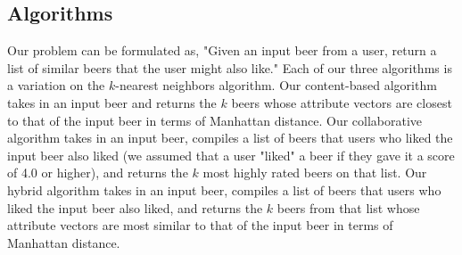 \documentclass[11pt]{article}
\begin{document}
\subsection*{Algorithms}
Our problem can be formulated as, "Given an input beer from a user, return a list of similar beers that the user might also like." Each of our three algorithms is a variation on the $k$-nearest neighbors algorithm. Our content-based algorithm takes in an input beer and returns the $k$ beers whose attribute vectors are closest to that of the input beer in terms of Manhattan distance. Our collaborative algorithm takes in an input beer, compiles a list of beers that users who liked the input beer also liked (we assumed that a user "liked"  a beer if they gave it a score of 4.0 or higher), and returns the $k$ most highly rated beers on that list. Our hybrid algorithm takes in an input beer, compiles a list of beers that users who liked the input beer also liked, and returns the $k$ beers from that list whose attribute vectors are most similar to that of the input beer in terms of Manhattan distance.
\end{document}
